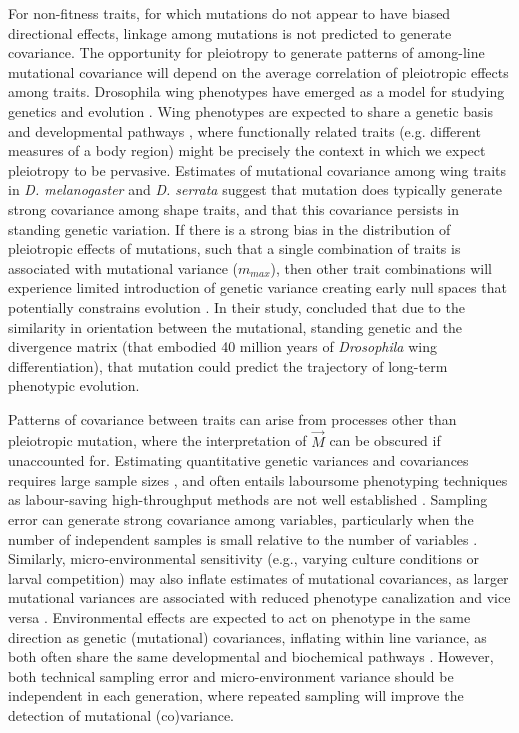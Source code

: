 For non-fitness traits, for which mutations do not appear to have biased directional effects, linkage among mutations is not predicted to generate covariance. The opportunity for pleiotropy to generate patterns of among-line mutational covariance will depend on the average correlation of pleiotropic effects among traits. Drosophila wing phenotypes have emerged as a model for studying genetics and evolution \citep{Meze05,Houl17}. Wing phenotypes are expected to share a genetic basis and developmental pathways \citep{Meze05, Neto09}, where functionally related traits (e.g. different measures of a body region) might be precisely the context in which we expect pleiotropy to be pervasive. Estimates of mutational covariance among wing traits in \textit{D. melanogaster} \citep{Houl13,Houl17} and \textit{D. serrata} \citep{Duga21} suggest that mutation does typically generate strong covariance among shape traits, and that this covariance persists in standing genetic variation. If there is a strong bias in the distribution of pleiotropic effects of mutations, such that a single combination of traits is associated with mutational variance ($m_{max}$), then other trait combinations will experience limited introduction of genetic variance creating early null spaces that potentially constrains evolution \citep{Gomu09,Houl13, Hine14}. In their study, \citet{Houl17} concluded that due to the similarity in orientation between the mutational, standing genetic and the divergence matrix (that embodied 40 million years of \textit{Drosophila} wing differentiation), that mutation could predict the trajectory of long-term phenotypic evolution. \par

Patterns of covariance between traits can arise from processes other than pleiotropic mutation, where the interpretation of $\vec{M}$ can be obscured if unaccounted for. Estimating quantitative genetic variances and covariances requires large sample sizes \citep{Klei73,Klei74,Lync98}, and often entails laboursome phenotyping techniques as labour-saving high-throughput methods are not well established \citep{Houl10}. Sampling error can generate strong covariance among variables, particularly when the number of independent samples is small relative to the number of variables \citep{John07, Blow15,Szte17a}. Similarly, micro-environmental sensitivity (e.g., varying culture conditions or larval competition) may also inflate estimates of mutational covariances, as larger mutational variances are associated with reduced phenotype canalization and vice versa \citep{Stea95,Zhan05env, Baer08}. Environmental effects are expected to act on phenotype in the same direction as genetic (mutational) covariances, inflating within line variance, as both often share the same developmental and biochemical pathways \citep{Chev84}. However, both technical sampling error and micro-environment variance should be independent in each generation, where repeated sampling will improve the detection of mutational (co)variance.\par

